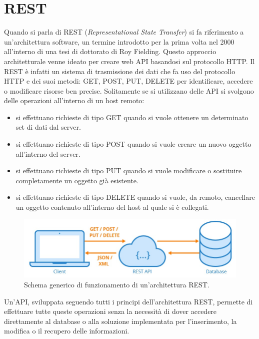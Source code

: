 \section{REST}
Quando si parla di REST (\textit{Representational State Transfer}) si fa riferimento a un'architettura software, un termine introdotto per 
la prima volta nel 2000 all'interno di una tesi di dottorato di Roy Fielding. Questo approccio architetturale venne ideato per creare 
web API basandosi sul protocollo HTTP. Il REST è infatti un sistema di trasmissione dei dati che fa uso del protocollo HTTP e dei suoi metodi: 
GET, POST, PUT, DELETE per identificare, accedere o modificare risorse ben precise.\hfill\break
Solitamente se si utilizzano delle API si svolgono delle operazioni all’interno di un host remoto:
\begin{itemize}
    \item si effettuano richieste di tipo GET quando si vuole ottenere un determinato set di dati dal server.
    \item si effettuano richieste di tipo POST quando si vuole creare un nuovo oggetto all’interno del server.
    \item si effettuano richieste di tipo PUT quando si vuole modificare o sostituire completamente un oggetto già esistente.
    \item si effettuano richieste di tipo DELETE quando si vuole, da remoto, cancellare un oggetto contenuto all’interno del 
    host al quale si è collegati.
\end{itemize}
%
\begin{figure}[ht!]
    \centering
    \includegraphics[scale=0.6]{images/api_rest.jpg}
    \caption[Schema di funzionamento di una architettura REST]{Schema generico di funzionamento di un'architettura REST.}
    \label{fig:rest_api}
\end{figure}
\hfill\break
Un'API, sviluppata seguendo tutti i principi dell'architettura REST, permette di effettuare tutte queste operazioni senza la necessità 
di dover accedere direttamente al database o alla soluzione implementata per l'inserimento, la modifica o il recupero delle informazioni.
%
